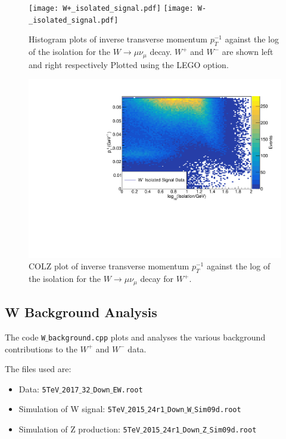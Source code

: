 \documentclass[a4paper]{article}
\begin{document}
\begin{figure}[t]
\centering
\texttt{[image: W+\_isolated\_signal.pdf]}
\texttt{[image: W-\_isolated\_signal.pdf]} \hspace{3mm}
\vspace{-8mm}
\caption{\small Histogram plots of inverse transverse momentum $p_T^{-1}$ against the log of the isolation for the $W \xrightarrow{} \mu \nu_\mu$ decay. $W^+$ and $W^-$ are shown left and right respectively Plotted using the LEGO option.}
\label{fig: LEGO}
\end{figure}

\begin{figure}[!h]
    \centering
    \includegraphics[clip, trim = 0cm 0cm 0.3cm 1.3cm, width=\textwidth]{W+_isolated_signal_COLZ.pdf}
    \vspace{-4mm}
    \caption{\small COLZ plot of inverse transverse momentum $p_T^{-1}$ against the log of the isolation for the $W \xrightarrow{} \mu \nu_\mu$ decay for $W^+$.}
    \label{fig: COLZ}
\end{figure}


\subsection{W Background Analysis} \label{sec: W background}

The code \texttt{W$\_$background.cpp} plots and analyses the various background contributions to the $W^+$ and $W^-$ data.

The files used are:
\begin{itemize}
    \item Data: \texttt{5TeV$\_$2017$\_$32$\_$Down$\_$EW.root}
    \item Simulation of W signal: \texttt{5TeV$\_$2015$\_$24r1$\_$Down$\_$W$\_$Sim09d.root}
    \item Simulation of Z production: \texttt{5TeV$\_$2015$\_$24r1$\_$Down$\_$Z$\_$Sim09d.root}
\end{itemize}
\end{document}
